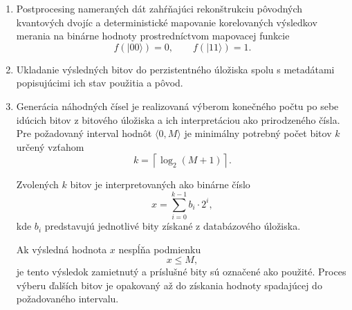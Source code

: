 \begin{enumerate}
  \item Postprocesing nameraných dát zahŕňajúci rekonštrukciu pôvodných kvantových dvojíc a deterministické mapovanie korelovaných výsledkov merania na binárne hodnoty prostredníctvom mapovacej funkcie
  \begin{equation}
    f(\lvert 00 \rangle) = 0, \qquad
    f(\lvert 11 \rangle) = 1.\label{eq:equation4}
  \end{equation}

  \item Ukladanie výsledných bitov do perzistentného úložiska spolu s metadátami popisujúcimi ich stav použitia a pôvod.

  \item Generácia náhodných čísel je realizovaná výberom konečného počtu po sebe idúcich bitov z bitového úložiska a ich interpretáciou ako prirodzeného čísla.
  Pre požadovaný interval hodnôt $\langle 0, M \rangle$ je minimálny potrebný počet bitov $k$ určený vzťahom
  \begin{equation}
    k = \left\lceil \log_2(M + 1) \right\rceil.\label{eq:equation3}
  \end{equation}

  Zvolených $k$ bitov je interpretovaných ako binárne číslo
  \begin{equation}
    x = \sum_{i=0}^{k-1} b_i \cdot 2^i,\label{eq:equation}
  \end{equation}
  kde $b_i$ predstavujú jednotlivé bity získané z databázového úložiska.

  Ak výsledná hodnota $x$ nespĺňa podmienku
  \begin{equation}
    x \leq M,\label{eq:equation2}
  \end{equation}
  je tento výsledok zamietnutý a príslušné bity sú označené ako použité.
  Proces výberu ďalších bitov je opakovaný až do získania hodnoty spadajúcej do požadovaného intervalu.
\end{enumerate}


